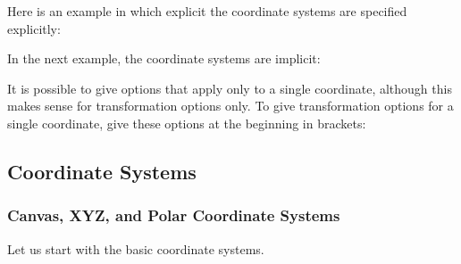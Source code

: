 Here is an example in which explicit the coordinate systems are
specified explicitly:
\begin{codeexample}[]
\end{codeexample}
In the next example, the coordinate systems are implicit:
\begin{codeexample}[]
\end{codeexample}

It is possible to give options that apply only to a single
coordinate, although this makes sense for transformation options
only. To give transformation options for a single coordinate, give
these options at the beginning in brackets:
\begin{codeexample}[]
\end{codeexample}


\subsection{Coordinate Systems}

\subsubsection{Canvas, XYZ, and Polar Coordinate Systems}

Let us start with the basic coordinate systems.

